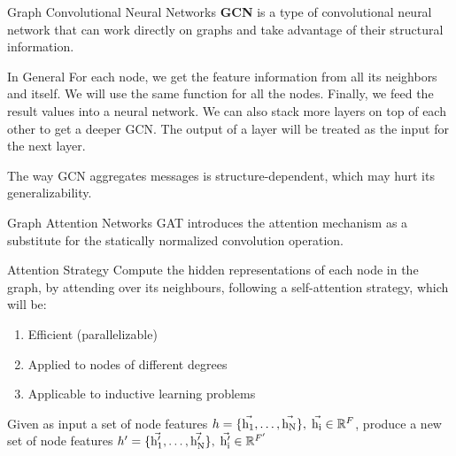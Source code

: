 \documentclass{beamer}
\theoremstyle{definition}
\begin{document}
\begin{frame}{Graph Convolutional Neural Networks}
    \textbf{GCN} is a type of convolutional neural network that can work directly on graphs and take advantage of their structural information.\\
    \bigskip \pause
    \begin{block}{In General}
        For each node, we get the feature information from all its neighbors and itself. We will use the same function for all the nodes. Finally, we feed the result values into a neural network. We can also stack more layers on top of each other to get a deeper GCN. The output of a layer will be treated as the input for the next layer.
    \end{block} \pause
    The way GCN aggregates messages is structure-dependent, which may hurt its generalizability.
\end{frame}

\begin{frame}{Graph Attention Networks}
    GAT introduces the attention mechanism as a substitute for the statically normalized convolution operation.
    \begin{block}{Attention Strategy}
        Compute the hidden representations of each node in the graph, by attending over its neighbours, following a self-attention strategy, which will be: 
        \begin{enumerate}
            \item Efficient (parallelizable)
            \item Applied to nodes of different degrees
            \item Applicable to inductive learning problems
        \end{enumerate}
    \end{block} \pause
    Given as input a set of node features \(h=\{\vec{\rm h_{1}},\dots,\vec{\rm h_{N}}\},\;\vec{\rm h_{i}}\in \mathbb{R}^{F}\), produce a new set of node features \(h'=\{\vec{\rm h'_{1}},\dots,\vec{\rm h'_{N}}\},\;\vec{\rm h'_{i}}\in \mathbb{R}^{F'}\)
\end{frame}
\end{document}
